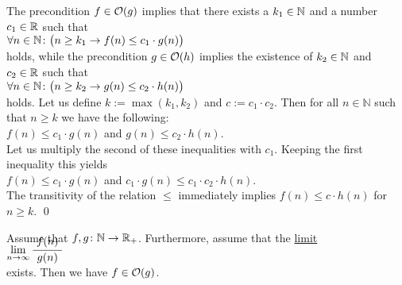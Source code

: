 \proof
The precondition $f \in \mathcal{O}(g)$ implies that there exists a $k_1 \in {\mathbb N}$ and a number $c_1 \in {\mathbb R}$
such that 
\\[0.2cm]
\hspace*{1.3cm} 
$\forall n \in {\mathbb N} \colon\bigl( n \geq k_1 \rightarrow f(n) \leq c_1 \cdot g(n)\bigr)$ 
\\[0.2cm]
holds, while the precondition $g \in \mathcal{O}(h)$ implies the existence of $k_2 \in {\mathbb N}$ and $c_2 \in {\mathbb R}$
such that \\[0.2cm]
\hspace*{1.3cm} 
$\forall n \in {\mathbb N} \colon\bigl( n \geq k_2 \rightarrow g(n) \leq c_2 \cdot h(n)\bigr)$ 
\\[0.2cm]
holds.  Let us define $k:= \max(k_1,k_2)$ and $c := c_1 \cdot c_2$.  Then for all $n \in \mathbb{N}$
such that $n \geq k$ we have the following:
\\[0.2cm]
\hspace*{1.3cm}
$f(n) \leq c_1\cdot g(n)$ \quad and \quad $g(n) \leq c_2 \cdot h(n)$. 
\\[0.2cm]
Let us multiply the second of these inequalities with $c_1$.  Keeping the first inequality this yields
\\[0.2cm]
\hspace*{1.3cm}
$f(n) \leq c_1\cdot g(n)$  \quad and \quad $c_1\cdot g(n) \leq c_1\cdot c_2 \cdot h(n)$. 
\\[0.2cm]
The transitivity of the relation $\leq$ immediately implies $f(n) \leq c \cdot h(n)$ for $n \geq k$.  
\qed

\begin{Proposition} \label{limit}
  Assume that $f,g \colon {\mathbb N} \rightarrow {{\mathbb R}_+}$.   Furthermore, assume that the \href{https://en.wikipedia.org/wiki/Limit_(mathematics)#Limit_of_a_sequence}{limit}
  \\[0.2cm]
  \hspace*{3.3cm}
 $\lim\limits_{n \rightarrow \infty} \bruch{\,f(n)\,}{g(n)}$
  \\[0.2cm]
  exists.  Then we have $f \in \mathcal{O}(g)$. 
\end{Proposition}

